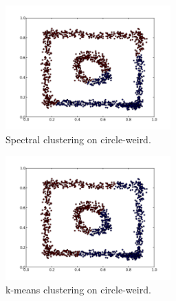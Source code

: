 \documentclass[conference]{IEEEtran}
\begin{document}
\begin{figure}[th]
\centering
\includegraphics[width=15pc]{spectral_circle-weird.pdf}
\caption{Spectral clustering on circle-weird.}
\label{spectral_circleweird}
\end{figure}

\begin{figure}[th]
\centering
\includegraphics[width=15pc]{kmeans_circle-weird.pdf}
\caption{k-means clustering on circle-weird.}
\label{kmeans_circleweird}
\end{figure}
\end{document}
